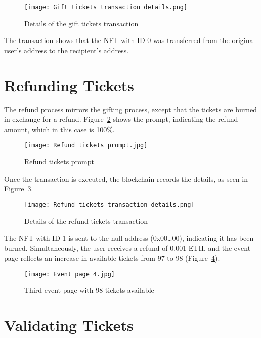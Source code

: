 \begin{figure}[H]
    \texttt{[image: Gift tickets transaction details.png]}
    \centering
    \caption{Details of the gift tickets transaction}\label{fig:gift_tickets_transaction_details}
\end{figure}

The transaction shows that the NFT with ID 0 was transferred from the original
user's address to the recipient's address.

\section{Refunding Tickets}\label{sec:refunding_tickets}

The refund process mirrors the gifting process, except that the tickets are
burned in exchange for a refund. Figure~\ref{fig:refund_tickets_prompt} shows
the prompt, indicating the refund amount, which in this case is 100\%.

\begin{figure}[H]
    \texttt{[image: Refund tickets prompt.jpg]}
    \centering
    \caption{Refund tickets prompt}\label{fig:refund_tickets_prompt}
\end{figure}

Once the transaction is executed, the blockchain records the details, as seen
in Figure~\ref{fig:refund_tickets_transaction_details}.

\begin{figure}[H]
    \texttt{[image: Refund tickets transaction details.png]}
    \centering
    \caption{Details of the refund tickets transaction}\label{fig:refund_tickets_transaction_details}
\end{figure}

The NFT with ID 1 is sent to the null address (0x00\dots00), indicating it has
been burned. Simultaneously, the user receives a refund of 0.001 ETH, and the
event page reflects an increase in available tickets from 97 to 98
(Figure~\ref{fig:refund_tickets_event}).

\begin{figure}[H]
    \texttt{[image: Event page 4.jpg]}
    \centering
    \caption{Third event page with 98 tickets available}\label{fig:refund_tickets_event}
\end{figure}

\section{Validating Tickets}\label{sec:validating_tickets}

